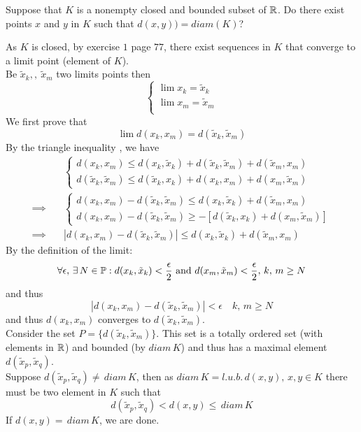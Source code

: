 \begin{tcolorbox}
Suppose that $K$ is a nonempty closed and bounded subset of $\mathbb{R}$. Do there exist points $x$ and $y$ in $K$  such that $d(x,y)) = diam (K)$?
\end{tcolorbox}
As $K$ is closed, by exercise $1$ page $77$, there exist sequences in $K$ that converge to a limit point (element of $K$).\\
Be $\tilde{x}_k,,\ \tilde{x}_m $ two limits points then
$$\begin{cases}
\lim x_k=\tilde{x}_k\\
\lim x_m=\tilde{x}_m\\
\end{cases}$$
We first prove that $$\lim d(x_k,x_m)= d(\tilde{x}_k ,\tilde{x}_m )$$
By the triangle inequality , we have 
\begin{align*}
&\begin{cases}
d(x_k,x_m)\leq d(x_k,\tilde{x}_k)+d(\tilde{x}_k,\tilde{x}_m)+d(\tilde{x}_m,x_m)\\
d(\tilde{x}_k,\tilde{x}_m)\leq d(\tilde{x}_k,x_k)+d(x_k,x_m)+d(x_m,\tilde{x}_m)
\end{cases}\\
\implies\quad
&\begin{cases}
d(x_k,x_m)-d(\tilde{x}_k,\tilde{x}_m)\leq d(x_k,\tilde{x}_k)+d(\tilde{x}_m,x_m)\\
d(x_k,x_m)-d(\tilde{x}_k,\tilde{x}_m)\geq -\left[ d(\tilde{x}_k,x_k)+d(x_m,\tilde{x}_m)\right]
\end{cases}\\
\implies\quad & \left|d(x_k,x_m)-d(\tilde{x}_k,\tilde{x}_m)\right| \leq d(x_k,\tilde{x}_k)+d(\tilde{x}_m,x_m)
\end{align*}
By the definition of the limit:
$$\forall\epsilon,\,\exists\, N\in\mathbb{P}: d(x_k,\tilde{x}_k)<\frac{\epsilon}{2}\text{ and } d(x_m,\tilde{x}_m)<\frac{\epsilon}{2},\, k,\, m \geq N$$
and thus
$$\left|d(x_k,x_m)-d(\tilde{x}_k,\tilde{x}_m)\right| < \epsilon\quad k,\, m \geq N$$
and thus $d(x_k,x_m) $ converges to $d(\tilde{x}_k,\tilde{x}_m)$.\\
Consider the set $P=\{d(\tilde{x}_k,\tilde{x}_m)\}$. This set is a totally ordered set (with elements in $\mathbb{R}$) and bounded (by $diam\, K$) and thus has a maximal element $d(\tilde{x}_p,\tilde{x}_q)$.\\
Suppose $d(\tilde{x}_p,\tilde{x}_q)\neq \, diam \, K$, then as $diam\, K= l.u.b.\, d(x,y),\, x,y\in K$ there must be two element in $K$ such that
$$d(\tilde{x}_p,\tilde{x}_q)<d(x,y)\leq \, diam \, K$$
If $d(x,y)= \, diam \, K$, we are done. \\
